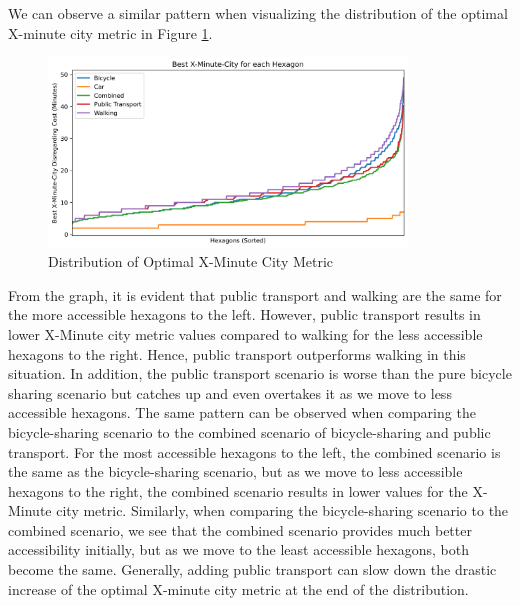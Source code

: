 We can observe a similar pattern when visualizing the distribution of the optimal X-minute city metric in Figure \ref{fig:optimal_x_minute_city_metric}.
\begin{figure}
  \begin{center}
    \includegraphics[width=0.85\textwidth]{Figures/results/minute_city_metric/best_x_minute_city}
  \end{center}
  \caption{Distribution of Optimal X-Minute City Metric}
  \label{fig:optimal_x_minute_city_metric}
\end{figure}
From the graph, it is evident that public transport and walking are the same for the more accessible hexagons to the left.
However, public transport results in lower X-Minute city metric values compared to walking for the less accessible hexagons to the right.
Hence, public transport outperforms walking in this situation.
In addition, the public transport scenario is worse than the pure bicycle sharing scenario but catches up and even overtakes it as we move to less accessible hexagons.
The same pattern can be observed when comparing the bicycle-sharing scenario to the combined scenario of bicycle-sharing and public transport.
For the most accessible hexagons to the left, the combined scenario is the same as the bicycle-sharing scenario, but as we move to less accessible hexagons to the right, the combined scenario results in lower values for the X-Minute city metric.
Similarly, when comparing the bicycle-sharing scenario to the combined scenario, we see that the combined scenario provides much better accessibility initially, but as we move to the least accessible hexagons, both become the same.
Generally, adding public transport can slow down the drastic increase of the optimal X-minute city metric at the end of the distribution.


